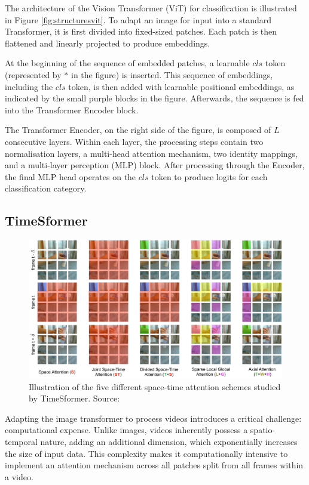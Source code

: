 The architecture of the Vision Transformer (ViT) for classification is illustrated in Figure \ref{fig:structuresvit}. To adapt an image for input into a standard Transformer, it is first divided into fixed-sized patches. Each patch is then flattened and linearly projected to produce embeddings. 

At the beginning of the sequence of embedded patches, a learnable $cls$ token (represented by $*$ in the figure) is inserted. This sequence of embeddings, including the $cls$ token, is then added with learnable positional embeddings, as indicated by the small purple blocks in the figure. Afterwards, the sequence is fed into the Transformer Encoder block. 

The Transformer Encoder, on the right side of the figure, is composed of $L$ consecutive layers. Within each layer, the processing steps contain two normalisation layers, a multi-head attention mechanism, two identity mappings, and a multi-layer perception (MLP) block. After processing through the Encoder, the final MLP head operates on the $cls$ token to produce logits for each classification category.

\subsection{TimeSformer}
\begin{figure}[ht]
    \centering
    \includegraphics[width=1.0\textwidth]{assets/charts_rw/Timesformer}
    \caption[Five different space-time attention schemes studied by TimeSformer]{Illustration of the five different space-time attention schemes studied by TimeSformer. Source: \parencite{bertasius2021space}}
    \label{fig:structurestimesformer}
\end{figure}

Adapting the image transformer to process videos introduces a critical challenge: computational expense. Unlike images, videos inherently possess a spatio-temporal nature, adding an additional dimension, which exponentially increases the size of input data. This complexity makes it computationally intensive to implement an attention mechanism across all patches split from all frames within a video.

